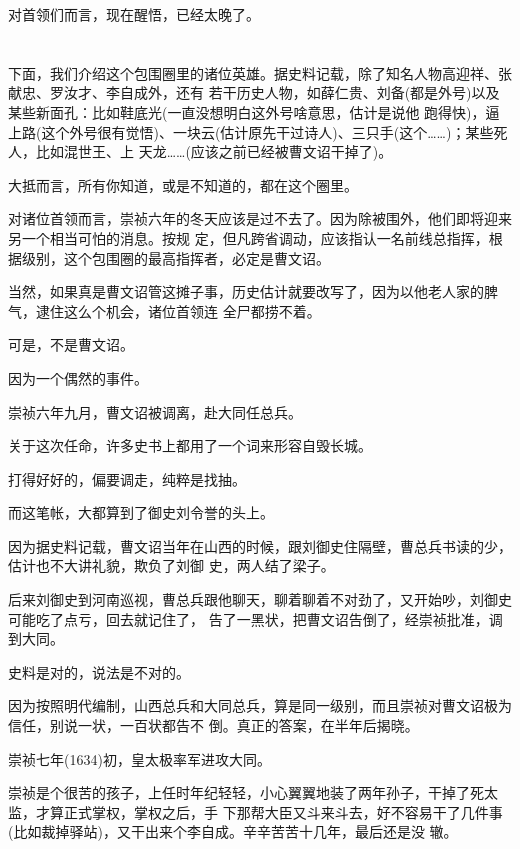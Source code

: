 \documentclass[11pt,a4paper,onecolumn]{article}
\begin{document}
对首领们而言，现在醒悟，已经太晚了。

\section[\thesection]{}

下面，我们介绍这个包围圈里的诸位英雄。据史料记载，除了知名人物高迎祥、张献忠、罗汝才、李自成外，还有
若干历史人物，如薛仁贵、刘备(都是外号)以及某些新面孔：比如鞋底光(一直没想明白这外号啥意思，估计是说他
跑得快)，逼上路(这个外号很有觉悟)、一块云(估计原先干过诗人)、三只手(这个……)；某些死人，比如混世王、上
天龙……(应该之前已经被曹文诏干掉了)。

大抵而言，所有你知道，或是不知道的，都在这个圈里。

对诸位首领而言，崇祯六年的冬天应该是过不去了。因为除被围外，他们即将迎来另一个相当可怕的消息。按规
定，但凡跨省调动，应该指认一名前线总指挥，根据级别，这个包围圈的最高指挥者，必定是曹文诏。

当然，如果真是曹文诏管这摊子事，历史估计就要改写了，因为以他老人家的脾气，逮住这么个机会，诸位首领连
全尸都捞不着。

可是，不是曹文诏。

因为一个偶然的事件。

崇祯六年九月，曹文诏被调离，赴大同任总兵。

关于这次任命，许多史书上都用了一个词来形容\myrule 自毁长城。

打得好好的，偏要调走，纯粹是找抽。

而这笔帐，大都算到了御史刘令誉的头上。

因为据史料记载，曹文诏当年在山西的时候，跟刘御史住隔壁，曹总兵书读的少，估计也不大讲礼貌，欺负了刘御
史，两人结了梁子。

后来刘御史到河南巡视，曹总兵跟他聊天，聊着聊着不对劲了，又开始吵，刘御史可能吃了点亏，回去就记住了，
告了一黑状，把曹文诏告倒了，经崇祯批准，调到大同。

史料是对的，说法是不对的。

因为按照明代编制，山西总兵和大同总兵，算是同一级别，而且崇祯对曹文诏极为信任，别说一状，一百状都告不
倒。真正的答案，在半年后揭晓。

崇祯七年(1634)初，皇太极率军进攻大同。

崇祯是个很苦的孩子，上任时年纪轻轻，小心翼翼地装了两年孙子，干掉了死太监，才算正式掌权，掌权之后，手
下那帮大臣又斗来斗去，好不容易干了几件事(比如裁掉驿站)，又干出来个李自成。辛辛苦苦十几年，最后还是没
辙。

\section[\thesection]{}
\end{document}
